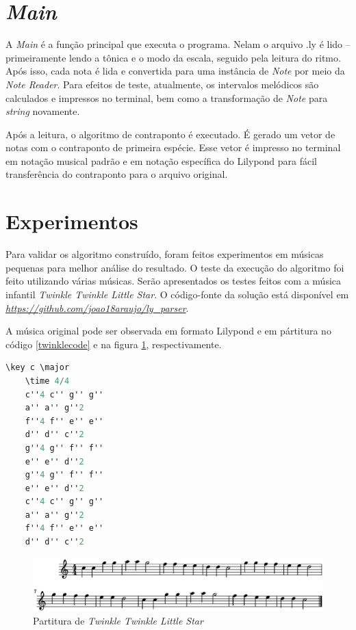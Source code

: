   \section[\textit{Main}]{\textit{Main}}

    A \textit{Main} é a função principal que executa o programa. Nelam o arquivo .ly é lido -- primeiramente lendo a tônica e o modo da escala, seguido pela leitura do ritmo. Após isso, cada nota é lida e convertida para uma instância de \textit{Note} por meio da \textit{Note Reader}. Para efeitos de teste, atualmente, os intervalos melódicos são calculados e impressos no terminal, bem como a transformação de \textit{Note} para \textit{string} novamente.

    Após a leitura, o algoritmo de contraponto é executado. É gerado um vetor de notas com o contraponto de primeira espécie. Esse vetor é impresso no terminal em notação musical padrão e em notação específica do Lilypond para fácil transferência do contraponto para o arquivo original.

  \section[Experimentos]{Experimentos}

    Para validar os algoritmo construído, foram feitos experimentos em músicas pequenas para melhor análise do resultado. O teste da execução do algoritmo foi feito utilizando várias músicas. Serão apresentados os testes feitos com a música infantil \textit{Twinkle Twinkle Little Star}. O código-fonte da solução está disponível em \textit{\url{https://github.com/joao18araujo/ly_parser}}.

    A música original pode ser observada em formato Lilypond e em pártitura no código \ref{twinklecode} e na figura \ref{twinkleoriginal}, respectivamente.

    \begin{lstlisting}[language={C}, caption={\textit{Twinkle Twinkle Little Star}}, label={twinklecode}]
    \key c \major
    \time 4/4
    c''4 c'' g'' g''
    a'' a'' g''2
    f''4 f'' e'' e''
    d'' d'' c''2
    g''4 g'' f'' f''
    e'' e'' d''2
    g''4 g'' f'' f''
    e'' e'' d''2
    c''4 c'' g'' g''
    a'' a'' g''2
    f''4 f'' e'' e''
    d'' d'' c''2
    \end{lstlisting}

    \begin{figure}[htb]
      \centering
      \includegraphics[scale=0.6]{figuras/twinkleoriginal.eps}
      \caption{Partitura de \textit{Twinkle Twinkle Little Star}}
      \label{twinkleoriginal}
    \end{figure}

